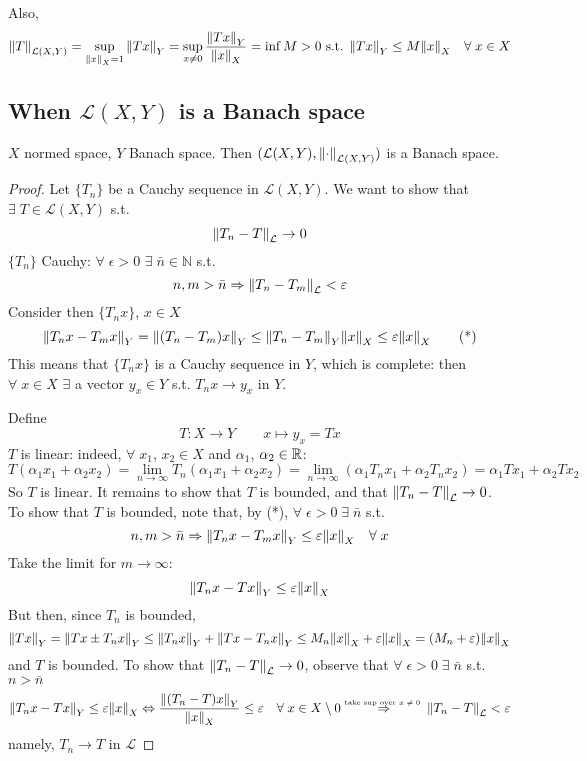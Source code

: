 Also, 
\[
    \norm{T}_{\mathcal{L}(X, Y)} = \sup_{\norm{x}_X = 1} \norm{Tx}_Y = \sup_{x \neq 0} \frac{\norm{Tx}_Y}{\norm{x}_X} = \inf{M >0 \text{ s.t. } \norm{Tx}_Y \leq M \norm{x}_X \quad \forall \; x \in X}
\]
\subsection{When \texorpdfstring{\(\mathcal{L}(X,Y)\)}{L(X,Y)} is a Banach space}
\begin{theorem}
    \(X\) normed space, \(Y\) Banach space. Then \((\mathcal{L}(X, Y), \norm{\cdot}_{\mathcal{L}(X, Y)})\) is a Banach space.
\end{theorem}
\begin{proof}
    Let \(\{T_n\}\) be a Cauchy sequence in \(\mathcal{L}(X, Y)\). We want to show that \(\exists \; T \in \mathcal{L}(X, Y) \) s.t.
    \[
        \norm{T_n - T}_\mathcal{L} \to 0
    \]
    \(\{T_n\}\) Cauchy: \(\forall \; \epsilon >0 \) \(\exists \; \bar{n} \in \mathbb{N}\) s.t. 
    \[
        n, m > \bar{n} \Rightarrow \norm{T_n - T_m }_\mathcal{L} < \varepsilon
    \]
    Consider then \(\{ T_n x \}\), \(x \in X\)
    \[
        \norm{T_n x - T_m x }_Y = \norm{(T_n - T_m)x}_Y \leq \norm{T_n - T_m}_Y \norm{x}_X \leq \varepsilon \norm{x}_X \tag{*}
    \]
    This means that \(\{ T_n x \}\) is a Cauchy sequence in \(Y\), which is complete: then \(\forall \; x \in X\) \(\exists \) a vector \(y_x \in Y\) s.t. \(T_n x \to y_x\) in \(Y\).

    Define 
    \[
        T: X \to Y \qquad x \mapsto y_x = Tx
    \]
    \(T\) is linear: indeed, \(\forall \; x_1\), \(x_2 \in X\) and \(\alpha_1\), \(\alpha_2 \in \mathbb{R}\):
    \[
        T(\alpha_1 x_1 + \alpha_2 x_2) = \lim_{n \to \infty} T_n (\alpha_1 x_1 + \alpha_2 x_2) = \lim_{n \to \infty} (\alpha_1 T_n x_1 + \alpha_2 T_n x_2) = \alpha_1 Tx_1 + \alpha_2 Tx_2
    \]
    So \(T \) is linear. It remains to show that \(T\) is bounded, and that \(\norm{T_n - T}_{\mathcal{L}} \to 0\).
    To show that \(T\) is bounded, note that, by (*), \(\forall \; \epsilon >0 \; \exists \; \bar{n}\) s.t.
    \[
        n, m > \bar{n} \Rightarrow \norm{T_n x - T_m x}_Y \leq \varepsilon \norm{x}_X \quad \forall \; x 
    \]
    Take the limit for \(m \to \infty\): 
    \[
        \norm{T_n x - Tx}_Y \leq \varepsilon \norm{x}_X
    \]
    But then, since \(T_n\) is bounded, 
    \[
        \norm{Tx}_Y = \norm{Tx \pm T_n x}_Y \leq \norm{T_n x}_Y + \norm{Tx - T_n x}_Y \leq M_n \norm{x}_X + \varepsilon \norm{x}_X = (M_n + \varepsilon) \norm{x}_X
    \]
    and \(T\) is bounded. To show that \(\norm{T_n - T}_\mathcal{L} \to 0\), observe that \(\forall \; \epsilon >0 \; \exists \; \bar{n} \) s.t. \(n > \bar{n}\)
    \[
        \norm{T_n x - Tx}_Y \leq \varepsilon \norm{x}_X 
        \Leftrightarrow \frac{\norm{(T_n - T)x}_Y}{\norm{x}_X} \leq \varepsilon \quad \forall \; x \in X \setminus {0}
        \overset{\text{\tiny{take sup over \(x \neq 0\)} }}{\Rightarrow} \norm{T_n - T}_\mathcal{L} < \varepsilon
    \]
    namely, \(T_n \to T\) in \(\mathcal{L}\)
\end{proof}
